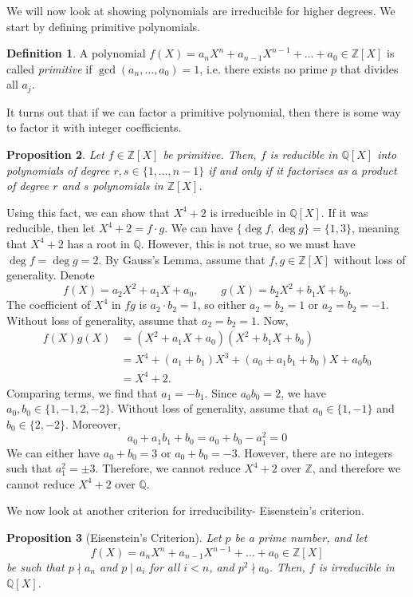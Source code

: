 \documentclass[a4paper, openany]{memoir}
\theoremstyle{definition}
\newtheorem{definition}{Definition}[section]
\theoremstyle{plain}
\newtheorem{proposition}[definition]{Proposition}
\begin{document}
We will now look at showing polynomials are irreducible for higher degrees. We start by defining primitive polynomials.
\begin{definition}
A polynomial $f(X) = a_n X^n + a_{n-1} X^{n-1} + \dots + a_0 \in \mathbb{Z}[X]$ is called \emph{primitive} if $\gcd(a_n, \dots, a_0) = 1$, i.e. there exists no prime $p$ that divides all $a_j$.
\end{definition}
\noindent It turns out that if we can factor a primitive polynomial, then there is some way to factor it with integer coefficients.
\begin{proposition}
Let $f \in \mathbb{Z}[X]$ be primitive. Then, $f$ is reducible in $\mathbb{Q}[X]$ into polynomials of degree $r, s \in \{1, \dots, n-1\}$ if and only if it factorises as a product of degree $r$ and $s$ polynomials in $\mathbb{Z}[X]$.
\end{proposition}

\noindent Using this fact, we can show that $X^4 + 2$ is irreducible in $\mathbb{Q}[X]$. If it was reducible, then let $X^4 + 2 = f \cdot g$. We can have $\{\deg f, \deg g\} = \{1, 3\}$, meaning that $X^4 + 2$ has a root in $\mathbb{Q}$. However, this is not true, so we must have $\deg f = \deg g = 2$. By Gauss's Lemma, assume that $f, g \in \mathbb{Z}[X]$ without loss of generality. Denote
\[f(X) = a_2X^2 + a_1X + a_0, \qquad g(X) = b_2X^2 + b_1X + b_0.\]
The coefficient of $X^4$ in $fg$ is $a_2 \cdot b_2 = 1$, so either $a_2 = b_2 = 1$ or $a_2 = b_2 = -1$. Without loss of generality, assume that $a_2 = b_2 = 1$. Now,
\begin{align*}
    f(X) g(X) &= (X^2 + a_1X + a_0)(X^2 + b_1X + b_0) \\
    &= X^4 + (a_1 + b_1) X^3 + (a_0 + a_1b_1 + b_0) X + a_0 b_0 \\
    &= X^4 + 2.
\end{align*}
Comparing terms, we find that $a_1 = -b_1$. Since $a_0 b_0 = 2$, we have $a_0, b_0 \in \{1, -1, 2, -2\}$. Without loss of generality, assume that $a_0 \in \{1, -1\}$ and $b_0 \in \{2, -2\}$. Moreover,
\[a_0 + a_1b_1 + b_0 = a_0 + b_0 - a_1^2 = 0\]
We can either have $a_0 + b_0 = 3$ or $a_0 + b_0 = -3$. However, there are no integers such that $a_1^2 = \pm 3$. Therefore, we cannot reduce $X^4 + 2$ over $\mathbb{Z}$, and therefore we cannot reduce $X^4 + 2$ over $\mathbb{Q}$.

We now look at another criterion for irreducibility- Eisenstein's criterion.
\begin{proposition}[Eisenstein's Criterion]
Let $p$ be a prime number, and let
\[f(X) = a_n X^n + a_{n-1} X^{n-1} + \dots + a_0 \in \mathbb{Z}[X]\]
be such that $p \nmid a_n$ and $p \mid a_i$ for all $i < n$, and $p^2 \nmid a_0$. Then, $f$ is irreducible in $\mathbb{Q}[X]$.
\end{proposition}
\end{document}
